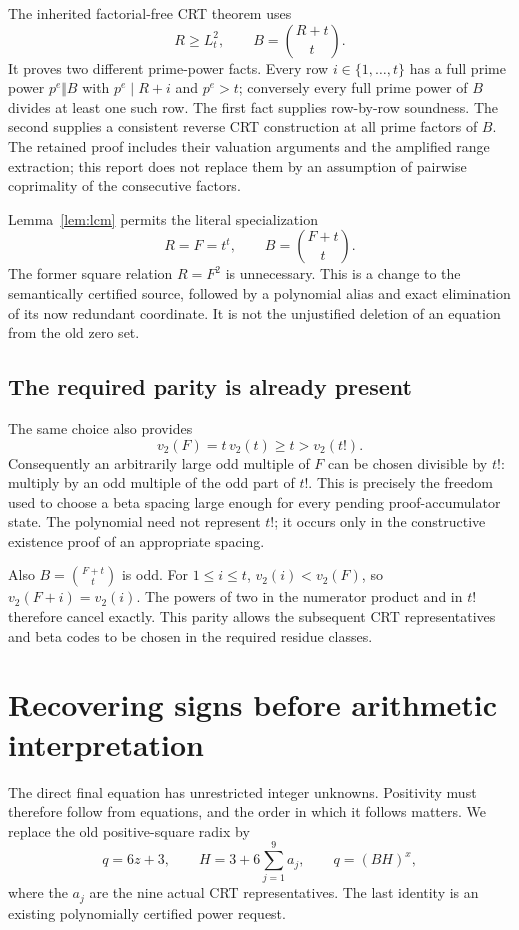 \documentclass[11pt]{article}
\theoremstyle{remark}\newtheorem{remark}[theorem]{Remark}
\begin{document}
The inherited factorial-free CRT theorem uses
\[
 R\ge L_t^2,\qquad B=\binom{R+t}{t}.
\]
It proves two different prime-power facts. Every row $i\in\{1,\ldots,t\}$
has a full prime power $p^e\Vert B$ with $p^e\mid R+i$ and $p^e>t$;
conversely every full prime power of $B$ divides at least one such row.
The first fact supplies row-by-row soundness. The second supplies a
consistent reverse CRT construction at all prime factors of $B$.
The retained proof includes their valuation arguments and the amplified
range extraction; this report does not replace them by an assumption of
pairwise coprimality of the consecutive factors.

Lemma~\ref{lem:lcm} permits the literal specialization
\begin{equation}\label{eq:shift}
 R=F=t^t,\qquad B=\binom{F+t}{t}.
\end{equation}
The former square relation $R=F^2$ is unnecessary. This is a change to
the semantically certified source, followed by a polynomial alias and
exact elimination of its now redundant coordinate. It is not the
unjustified deletion of an equation from the old zero set.

\subsection{The required parity is already present}

The same choice also provides
\[
 v_2(F)=t\,v_2(t)\ge t>v_2(t!).
\]
Consequently an arbitrarily large odd multiple of $F$ can be chosen
divisible by $t!$: multiply by an odd multiple of the odd part of $t!$.
This is precisely the freedom used to choose a beta spacing large enough
for every pending proof-accumulator state. The polynomial need not
represent $t!$; it occurs only in the constructive existence proof of an
appropriate spacing.

Also $B=\binom{F+t}{t}$ is odd. For $1\le i\le t$,
$v_2(i)<v_2(F)$, so $v_2(F+i)=v_2(i)$. The powers of two in the
numerator product and in $t!$ therefore cancel exactly. This parity
allows the subsequent CRT representatives and beta codes to be chosen in
the required residue classes.

\section{Recovering signs before arithmetic interpretation}\label{sec:signs}

The direct final equation has unrestricted integer unknowns. Positivity
must therefore follow from equations, and the order in which it follows
matters. We replace the old positive-square radix by
\begin{equation}\label{eq:radix}
 q=6z+3,\qquad H=3+6\sum_{j=1}^{9}a_j,\qquad q=(BH)^x,
\end{equation}
where the $a_j$ are the nine actual CRT representatives. The last identity
is an existing polynomially certified power request.
\end{document}
